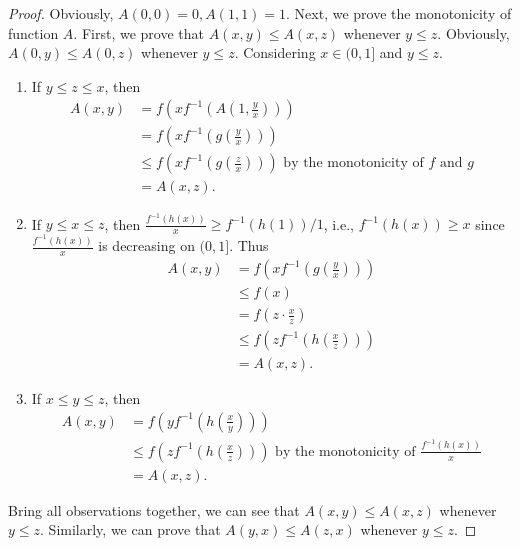 \documentclass[12pt]{article}
\begin{document}
\begin{proof}
 Obviously, $A(0,0)=0, A(1,1)=1$.
Next, we prove the monotonicity of function $A$. First, we prove that $A(x,y)\leq A(x,z)$ whenever $y\leq z$.
Obviously, $A(0, y)\leq A(0, z)$ whenever $y\leq z$. Considering $x\in(0, 1]$ and $y\leq z$.
\begin{enumerate}
\item [$\diamond$] If $y\leq z\leq x$, then
\begin{equation*}
\begin{split}
A(x,y)&=f(xf^{-1}(A(1,\frac{y}{x})))\\
&=f(xf^{-1}(g(\frac{y}{x})))\\
&\leq f(xf^{-1}(g(\frac{z}{x})))  \mbox{ by the monotonicity  of } f\mbox{ and }g\\
&=A(x,z).
\end{split}
\end{equation*}
\item [$\diamond$]If $y\leq x\leq z$, then $\frac {f^{-1}(h(x))}{x}\geq f^{-1}(h(1))/1$, i.e., $f^{-1}(h(x))\geq x$ since $\frac {f^{-1}(h(x))}{x}$ is decreasing on $(0, 1]$. Thus
\begin{equation*}
\begin{split}
A(x,y)&=f(xf^{-1}(g(\frac{y}{x})))\\
&\leq f(x)\\
&=f(z\cdot\frac{x}{z})\\
&\leq f(zf^{-1}(h(\frac{x}{z})))\\
&=A(x,z).
\end{split}
\end{equation*}
\item [$\diamond$] If $x\leq y\leq z$, then
\begin{equation*}
\begin{split}
A(x,y)&=f(yf^{-1}(h(\frac{x}{y})))\\
&\leq f(zf^{-1}(h(\frac{x}{z}))) \mbox{  by the monotonicity of } \frac {f^{-1}(h(x))}{x}\\
&=A(x,z).
\end{split}
\end{equation*}
\end{enumerate}

Bring all observations together, we can see that $A(x,y)\leq A(x,z)$ whenever $y\leq z$. Similarly, we can prove that $A(y,x)\leq A(z,x)$ whenever $y\leq z$.


\end{proof}
\end{document}
